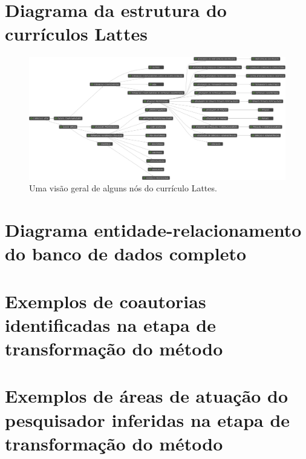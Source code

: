 
\begin{apendicesenv}

\partapendices

\chapter{Diagrama da estrutura do currículos Lattes}
\label{ap:diagramalattes}

\begin{figure}[htpb]
  \centering
  \includegraphics[width=1\textwidth]{figuras/diagrama-curriculo-lattes}
  \caption{Uma visão geral de alguns nós do currículo Lattes.}
  \label{fig:curriculo}
\end{figure}

\chapter{Diagrama entidade-relacionamento do banco de dados completo}

\chapter{Exemplos de coautorias identificadas na etapa de transformação do método}

\chapter{Exemplos de áreas de atuação do pesquisador inferidas na etapa de transformação do método}

\end{apendicesenv}

